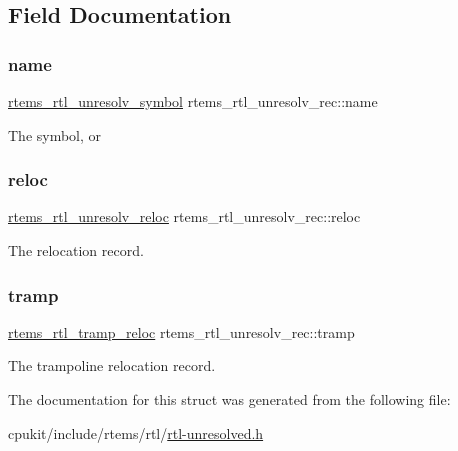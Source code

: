 \subsection{Field Documentation}
\mbox{\label{structrtems__rtl__unresolv__rec_a2d0b1f9feb91f2330d91166efe13dea0}} 
\subsubsection{\texorpdfstring{name}{name}}
{\footnotesize\ttfamily \mbox{\hyperlink{structrtems__rtl__unresolv__symbol}{rtems\+\_\+rtl\+\_\+unresolv\+\_\+symbol}} rtems\+\_\+rtl\+\_\+unresolv\+\_\+rec\+::name}

The symbol, or \mbox{\label{structrtems__rtl__unresolv__rec_abcdc5fbd48b7631d32938251513938e3}} 
\subsubsection{\texorpdfstring{reloc}{reloc}}
{\footnotesize\ttfamily \mbox{\hyperlink{structrtems__rtl__unresolv__reloc}{rtems\+\_\+rtl\+\_\+unresolv\+\_\+reloc}} rtems\+\_\+rtl\+\_\+unresolv\+\_\+rec\+::reloc}

The relocation record. \mbox{\label{structrtems__rtl__unresolv__rec_a7916e67c4ea764cf5aa1a152523edfd0}} 
\subsubsection{\texorpdfstring{tramp}{tramp}}
{\footnotesize\ttfamily \mbox{\hyperlink{structrtems__rtl__tramp__reloc}{rtems\+\_\+rtl\+\_\+tramp\+\_\+reloc}} rtems\+\_\+rtl\+\_\+unresolv\+\_\+rec\+::tramp}

The trampoline relocation record. 

The documentation for this struct was generated from the following file\+:\begin{DoxyCompactItemize}
\item 
cpukit/include/rtems/rtl/\mbox{\hyperlink{rtl-unresolved_8h}{rtl-\/unresolved.\+h}}\end{DoxyCompactItemize}
